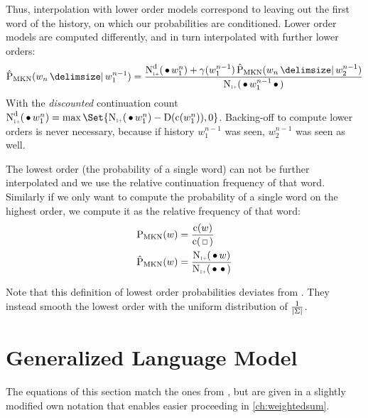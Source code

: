 Thus, interpolation with lower order models correspond to leaving out the first
word of the history, on which our probabilities are conditioned.
Lower order models are computed differently, and in turn interpolated with
further lower orders:
\begin{equation}
  \label{eq:mkn-low}
  \ProbMKN*{w_n}{w_1^{n-1}} =
    \frac{\DiscountedCount*(\WSkp w_1^n) + \gamma(w_1^{n-1}) \ProbMKN*{w_n}{w_2^{n-1}}}
         {\ContCountIp(\WSkp w_1^{n-1} \WSkp)} \\
\end{equation}
With the \emph{discounted} continuation count
${\DiscountedCount*(\WSkp w_1^n) = \max\Set{ \ContCountIp(\WSkp w_1^n) - \Discount(\Count(w_1^n)), 0 }}$.
Backing-off to compute lower orders is never necessary, because
if history $w_1^{n-1}$ was seen, $w_2^{n-1}$ was seen as well.

The lowest order (the probability of a single word) can not be further
interpolated and we use the relative continuation frequency of that word.
Similarly if we only want to compute the probability of a single word on the
highest order, we compute it as the relative frequency of that word:
\begin{subequations}
  \label{eq:mkn-lowest}
  \begin{align}
    \label{eq:mkn-lowest-abs}
    \ProbMKN {w} &= \frac{\Count(w)}{\Count(\Skp)} \\
    \label{eq:mkn-lowest-cont}
    \ProbMKN*{w} &= \frac{\ContCountIp(\WSkp w)}{\ContCountIp(\WSkp \WSkp)}
  \end{align}
\end{subequations}

Note that this definition of lowest order probabilities deviates from
\textcite{ChenGoodman1999}.
They instead smooth the lowest order with the uniform distribution of
$\frac{1}{\left|\Sigma\right|}$.


\section{Generalized Language Model}
\label{sec:review-lm-glm}

The equations of this section match the ones from \textcite{Pickhardt2014},
but are given in a slightly modified own notation that enables easier proceeding
in \cref{ch:weightedsum}.

